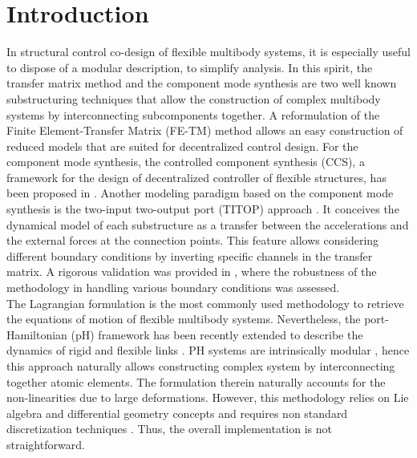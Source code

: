 \documentclass{svjour3}                     %
\begin{document}
\section{Introduction}
\label{intro}
\indent In structural control co-design of flexible multibody systems, it is especially useful to dispose of a modular description, to simplify analysis. In this spirit, the transfer matrix method \cite{Rui2005} and the component mode synthesis \cite{HurtyCMS} are two well known substructuring techniques that allow the construction of complex multibody systems by interconnecting subcomponents together. A reformulation of the Finite Element-Transfer Matrix (FE-TM) method \cite{TAN199047} allows an easy construction of reduced models that are suited for decentralized control design. For the component mode synthesis, the controlled component synthesis (CCS), a framework for the design of decentralized controller of flexible structures, has been proposed in \cite{YoungCMS}. Another modeling paradigm based on the component mode synthesis is the two-input two-output port (TITOP) approach \cite{TITOP}. It conceives the dynamical model of each substructure as a transfer between the accelerations and the external forces at the connection points. This feature allows considering different boundary conditions by inverting specific channels in the transfer matrix. A rigorous validation was provided in \cite{Perez,SANFEDINO2018128}, where the robustness of the methodology in handling various boundary conditions was assessed. \\
\indent The Lagrangian formulation is the most commonly used methodology to retrieve the equations of motion of flexible multibody systems. Nevertheless, the port-Hamiltonian (pH) framework \cite{bookPHs} has been recently extended to describe the dynamics of rigid and flexible links \cite{macchelli_fl,macchelli_flrig}. PH systems are intrinsically modular \cite{CerveraIntFinite}, hence this approach naturally allows constructing complex system by interconnecting together atomic elements. The formulation therein naturally accounts for the non-linearities due to large deformations.  However, this methodology relies on Lie algebra and differential geometry concepts and requires non standard discretization techniques \cite{Golo}. Thus, the overall implementation is not straightforward. \\
\end{document}
